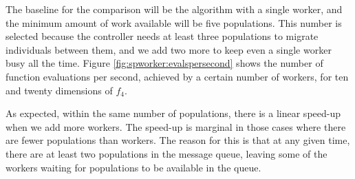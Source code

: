 \documentclass[review]{elsarticle}
\begin{document}
The baseline for the comparison will be the algorithm with a single worker, 
and the minimum amount of work available will be five populations. 
This number is selected because the controller needs at least
three populations to migrate individuals between them, and we add two more to
keep even a single worker busy all the time. Figure \ref{fig:spworker:evalspersecond} 
shows the number of function evaluations per second, achieved by a certain number of
workers, for ten and twenty dimensions of $f_4$.  


%
As expected, within the same number of populations, there is a linear speed-up
when we add more workers. The speed-up is marginal in those cases where there 
are fewer populations than workers.  The reason for this is that at any given time, 
there are at least two populations in the message queue, leaving some of the workers 
waiting for populations to be available in the queue.
\end{document}
